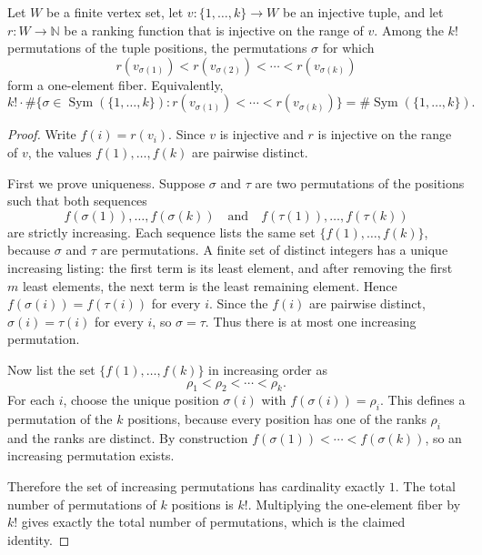 \begin{helper}
Let \(W\) be a finite vertex set, let \(v:\{1,\ldots,k\}\to W\) be an injective tuple, and let \(r:W\to\mathbb N\) be a ranking function that is injective on the range of \(v\). Among the \(k!\) permutations of the tuple positions, the permutations \(\sigma\) for which
\[
  r(v_{\sigma(1)})<r(v_{\sigma(2)})<\cdots<r(v_{\sigma(k)})
\]
form a one-element fiber. Equivalently,
\[
  k!\cdot
  \#\{\sigma\in\operatorname{Sym}(\{1,\ldots,k\}): r(v_{\sigma(1)})<\cdots<r(v_{\sigma(k)})\}
  =
  \#\operatorname{Sym}(\{1,\ldots,k\}).
\]
\end{helper}
\begin{proof}
Write \(f(i)=r(v_i)\). Since \(v\) is injective and \(r\) is injective on the range of \(v\), the values \(f(1),\ldots,f(k)\) are pairwise distinct.

First we prove uniqueness. Suppose \(\sigma\) and \(\tau\) are two permutations of the positions such that both sequences
\[
  f(\sigma(1)),\ldots,f(\sigma(k))
  \quad\text{and}\quad
  f(\tau(1)),\ldots,f(\tau(k))
\]
are strictly increasing. Each sequence lists the same set \(\{f(1),\ldots,f(k)\}\), because \(\sigma\) and \(\tau\) are permutations. A finite set of distinct integers has a unique increasing listing: the first term is its least element, and after removing the first \(m\) least elements, the next term is the least remaining element. Hence \(f(\sigma(i))=f(\tau(i))\) for every \(i\). Since the \(f(i)\) are pairwise distinct, \(\sigma(i)=\tau(i)\) for every \(i\), so \(\sigma=\tau\). Thus there is at most one increasing permutation.

Now list the set \(\{f(1),\ldots,f(k)\}\) in increasing order as
\[
  \rho_1<\rho_2<\cdots<\rho_k .
\]
For each \(i\), choose the unique position \(\sigma(i)\) with \(f(\sigma(i))=\rho_i\). This defines a permutation of the \(k\) positions, because every position has one of the ranks \(\rho_i\) and the ranks are distinct. By construction \(f(\sigma(1))<\cdots<f(\sigma(k))\), so an increasing permutation exists.

Therefore the set of increasing permutations has cardinality exactly \(1\). The total number of permutations of \(k\) positions is \(k!\). Multiplying the one-element fiber by \(k!\) gives exactly the total number of permutations, which is the claimed identity.
\end{proof}
